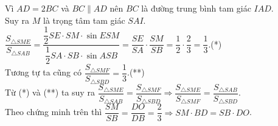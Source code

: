 \begin{ex}
{\begin{enumerate}
\begin{center}
			\end{center}
			Vì $AD=2BC$ và $BC\parallel AD$ nên $BC$ là đường trung bình tam giác $IAD$.\\
			      Suy ra $ M $ là trọng tâm tam giác $SAI$.\\
			      $\dfrac{S_{\triangle SME}}{S_{\triangle SAB}}=\dfrac{\dfrac12 SE\cdot SM \cdot \sin ESM}{ \dfrac12 SA \cdot SB \cdot \sin ASB} = \dfrac{SE}{SA} \cdot \dfrac{SM}{SB} = \dfrac12 \cdot \dfrac23 = \dfrac13 $.\hfill(*)\\
			      Tương tự ta cũng có $\dfrac{S_{\triangle SMF}}{S_{\triangle SBD}}=\dfrac{1}{3} $.\hfill(**)\\
			      Từ (*) và (**) ta suy ra $ \dfrac{S_{\triangle SME}}{S_{\triangle SAB}}=\dfrac{S_{\triangle SMF}}{S_{\triangle SBD}}\Rightarrow \dfrac{S_{\triangle SME}}{S_{\triangle SMF}}=\dfrac{S_{\triangle SAB}}{S_{\triangle SBD}} $.\\
			      Theo chứng minh trên thì $ \dfrac{SM}{SB}=\dfrac{DO}{DB} = \dfrac23 \Rightarrow SM\cdot BD=SB\cdot DO $.
		\end{enumerate}
	}
\end{ex}
